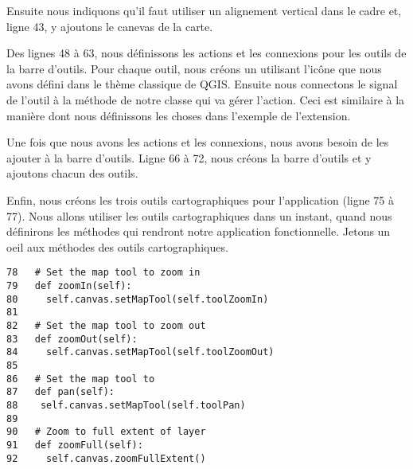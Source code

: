 Ensuite nous indiquons qu'il faut utiliser un alignement vertical dans le cadre et, ligne 43, y ajoutons le canevas de la carte.

Des lignes 48 à 63, nous définissons les actions et les connexions pour les outils de la barre d'outils. Pour chaque outil, nous créons un  utilisant l'icône que nous avons défini dans le thème classique de QGIS. Ensuite nous connectons le signal  de l'outil à la méthode de notre classe qui va gérer l'action. Ceci est similaire à la manière dont nous définissons les choses dans l'exemple de l'extension.

Une fois que nous avons les actions et les connexions, nous avons besoin de les ajouter à la barre d'outils. Ligne 66 à 72, nous créons la barre d'outils et y ajoutons chacun des outils.

Enfin, nous créons les trois outils cartographiques pour l'application (ligne 75 à 77). Nous allons utiliser les outils cartographiques dans un instant, quand nous définirons les méthodes qui rendront notre application fonctionnelle. Jetons un oeil aux méthodes des outils cartographiques.

\begin{verbatim}
78   # Set the map tool to zoom in
79   def zoomIn(self):
80     self.canvas.setMapTool(self.toolZoomIn)
81 
82   # Set the map tool to zoom out
83   def zoomOut(self):
84     self.canvas.setMapTool(self.toolZoomOut)
85 
86   # Set the map tool to 
87   def pan(self):
88    self.canvas.setMapTool(self.toolPan)
89 
90   # Zoom to full extent of layer
91   def zoomFull(self):
92     self.canvas.zoomFullExtent()
\end{verbatim}

